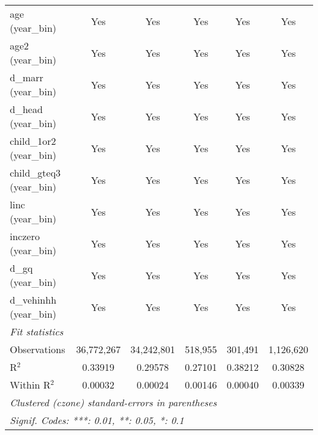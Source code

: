 \begin{tabular}{lccccc}
   age (year\_bin)                         & Yes           & Yes           & Yes           & Yes           & Yes\\  
   age2 (year\_bin)                        & Yes           & Yes           & Yes           & Yes           & Yes\\  
   d\_marr (year\_bin)                     & Yes           & Yes           & Yes           & Yes           & Yes\\  
   d\_head (year\_bin)                     & Yes           & Yes           & Yes           & Yes           & Yes\\  
   child\_1or2 (year\_bin)                 & Yes           & Yes           & Yes           & Yes           & Yes\\  
   child\_gteq3 (year\_bin)                & Yes           & Yes           & Yes           & Yes           & Yes\\  
   linc (year\_bin)                        & Yes           & Yes           & Yes           & Yes           & Yes\\  
   inczero (year\_bin)                     & Yes           & Yes           & Yes           & Yes           & Yes\\  
   d\_gq (year\_bin)                       & Yes           & Yes           & Yes           & Yes           & Yes\\  
   d\_vehinhh (year\_bin)                  & Yes           & Yes           & Yes           & Yes           & Yes\\  
   \midrule
   \emph{Fit statistics}\\
   Observations                            & 36,772,267    & 34,242,801    & 518,955       & 301,491       & 1,126,620\\  
   R$^2$                                   & 0.33919       & 0.29578       & 0.27101       & 0.38212       & 0.30828\\  
   Within R$^2$                            & 0.00032       & 0.00024       & 0.00146       & 0.00040       & 0.00339\\  
   \midrule \midrule
   \multicolumn{6}{l}{\emph{Clustered (czone) standard-errors in parentheses}}\\
   \multicolumn{6}{l}{\emph{Signif. Codes: ***: 0.01, **: 0.05, *: 0.1}}\\
\end{tabular}
\par\endgroup


